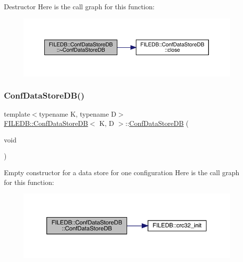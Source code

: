 Destructor Here is the call graph for this function\+:
\nopagebreak
\begin{figure}[H]
\begin{center}
\leavevmode
\includegraphics[width=350pt]{d8/d19/classFILEDB_1_1ConfDataStoreDB_a39b48750dbc9bd0d4ca8c9787edee897_cgraph}
\end{center}
\end{figure}
\mbox{\label{classFILEDB_1_1ConfDataStoreDB_a575d901daeccae08bcda5b2a60681e1b}} 
\subsubsection{\texorpdfstring{ConfDataStoreDB()}{ConfDataStoreDB()}\hspace{0.1cm}{\footnotesize\ttfamily [2/3]}}
{\footnotesize\ttfamily template$<$typename K, typename D$>$ \\
\mbox{\hyperlink{classFILEDB_1_1ConfDataStoreDB}{F\+I\+L\+E\+D\+B\+::\+Conf\+Data\+Store\+DB}}$<$ K, D $>$\+::\mbox{\hyperlink{classFILEDB_1_1ConfDataStoreDB}{Conf\+Data\+Store\+DB}} (\begin{DoxyParamCaption}\item[{void}]{ }\end{DoxyParamCaption})\hspace{0.3cm}{\ttfamily [inline]}}

Empty constructor for a data store for one configuration Here is the call graph for this function\+:
\nopagebreak
\begin{figure}[H]
\begin{center}
\leavevmode
\includegraphics[width=350pt]{d8/d19/classFILEDB_1_1ConfDataStoreDB_a575d901daeccae08bcda5b2a60681e1b_cgraph}
\end{center}
\end{figure}
\mbox{\label{classFILEDB_1_1ConfDataStoreDB_a39b48750dbc9bd0d4ca8c9787edee897}} 
